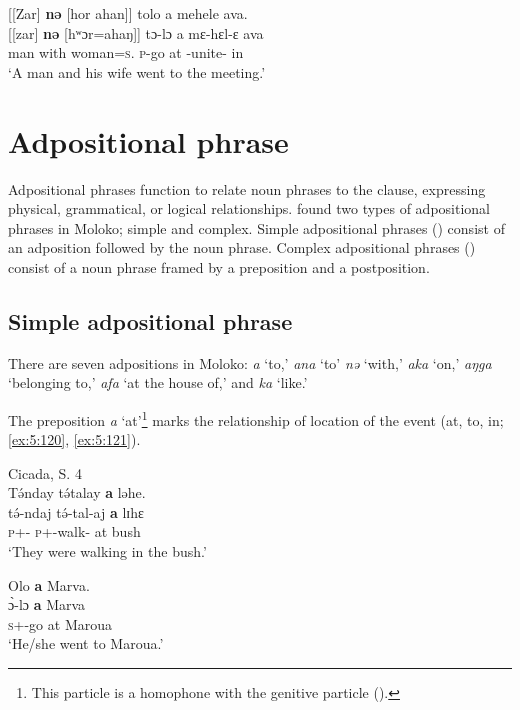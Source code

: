 \ea \label{ex:5:119}
{}[[Zar]  \textbf{nə}  [hor  ahan]]  tolo  a  mehele  ava.\\
\gll  {}[[zar]    \textbf{nə}  [hʷɔr=ahaŋ]]  tɔ-lɔ  a  mɛ-hɛl-ɛ    ava\\
      man    with  woman=\textsc{s}.{\POSS}  \textsc{p}-go  at  {\NOM}{}-unite{}-{\CL}  in\\
\glt  ‘A man and his wife went to the meeting.’ 
\z

\section{Adpositional phrase}\label{sec:5.6}
\hypertarget{RefHeading1211821525720847}{}
Adpositional phrases function to relate noun phrases to the clause, expressing physical, grammatical, or logical relationships.  \citet{FriesenMamalis2008} found two types of adpositional phrases in Moloko; simple and complex. Simple adpositional phrases () consist of an adposition followed by the noun phrase. Complex adpositional phrases () consist of a noun phrase framed by a preposition and a postposition. 

\subsection{Simple adpositional phrase}\label{sec:5.6.1}
\hypertarget{RefHeading1211841525720847}{}
There are seven adpositions in Moloko: \textit{a} ‘to,’ \textit{ana} ‘to’ \textit{nə} ‘with,’ \textit{aka} ‘on,’ \textit{a}\textit{ŋ}\textit{ga} ‘belonging to,’ \textit{afa} ‘at the house of,’ and \textit{ka} ‘like.’  

The preposition \textit{a} ‘at’\footnote{This particle is a homophone with the genitive particle (). } marks the relationship of location of the event (at, to, in; \ref{ex:5:120}, \ref{ex:5:121}).


\ea \label{ex:5:120}\corpussource Cicada, S. 4\\
T\'{ə}nday  t\'{ə}talay  \textbf{a} ləhe.\\
\gll  t\'{ə}-ndaj t\'{ə}-tal-aj    \textbf{a}  lɪhɛ\\
      \textsc{p}+{\IFV}-{\PRG}  \textsc{p}+{\IFV}-walk{}-{\CL}  at  bush\\
\glt  ‘They were walking in the bush.’ 
\z

\ea \label{ex:5:121}
Olo  \textbf{a}  Marva.\\
\gll  \`{ɔ}{}-lɔ    \textbf{a}  Marva\\
      \textsc{s}+{\PFV}-go  at  Maroua\\
\glt  ‘He/she went to Maroua.’ 
\z

